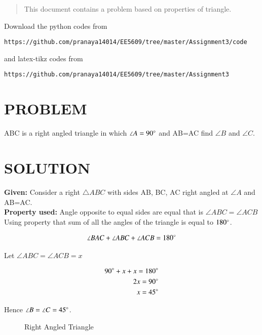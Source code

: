 \begin{abstract}
This document contains a problem based on properties of triangle.
\end{abstract}

Download the python codes from 
%
\begin{lstlisting}
https://github.com/pranaya14014/EE5609/tree/master/Assignment3/code
\end{lstlisting}
%
and latex-tikz codes from 
%
\begin{lstlisting}
https://github.com/pranaya14014/EE5609/tree/master/Assignment3
\end{lstlisting}
%
\section{PROBLEM}
ABC is a right angled triangle in which $\angle A=90\degree$ and AB=AC find $\angle B$ and $\angle C$. 

\section{SOLUTION}
\textbf{Given:} Consider a right $\triangle{ABC}$ with sides AB, BC, AC right angled at $\angle A$ and AB=AC.\\

\textbf{Property used:} Angle opposite to equal sides are equal that is $\angle ABC = \angle ACB $\\

Using property that sum of all the angles of the triangle is equal to $180 \degree$.

\begin{align}
    \angle BAC + \angle ABC + \angle ACB = 180\degree
\end{align}

Let $\angle ABC = \angle ACB = x $

\begin{align}
    90\degree + x + x = 180 \degree
\\
    2x = 90\degree
\\
    x=45\degree
\end{align}

Hence $\angle B = \angle C = 45\degree$.

\begin{figure}[h!]
\begin{center}
	\resizebox{\columnwidth/1}{!}{}
\end{center}
\caption{Right Angled Triangle}
\label{fig:Triangle}
\end{figure}

